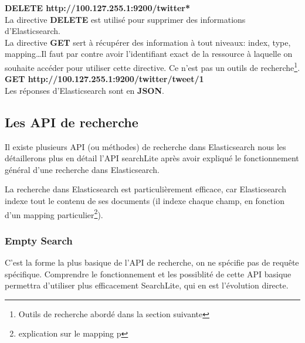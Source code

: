 {\textbf{DELETE  {\color{grey} http://100.127.255.1:9200}/{\color{red}twitter*}}\\

La directive \textbf{DELETE} est utilisé pour supprimer des informations d'Elasticsearch.\\


La directive \textbf{GET} sert à récupérer des information à tout niveaux: index,
type, mapping\ldots Il faut par contre avoir l'identifiant exact de la ressource à laquelle on souhaite accéder pour utiliser cette directive.
Ce n'est pas un outils de recherche\footnote{Outils de recherche abordé dans la section suivante}.\\[2mm]
\textbf{GET  {\color{grey} http://100.127.255.1:9200}/{\color{red}twitter}/{\color{cyan}tweet}/{\color{yellow}1}}\\

Les réponses d'Elasticsearch sont en \textbf{JSON}. 


\subsection{Les API de recherche}

Il existe plusieurs API (ou méthodes) de recherche dans Elasticsearch nous les  
détaillerons plus en détail l'API searchLite après avoir expliqué le fonctionnement général d'une recherche dans Elasticsearch.

La recherche dans Elasticsearch est particulièrement efficace, car Elasticsearch 
indexe tout le contenu de ses documents (il indexe chaque champ, en fonction d'un
mapping particulier\footnote{explication sur le mapping p\pageref{sec:mappingetanalys}}).

\subsubsection{Empty Search}
C'est la forme la plus basique de l'API de recherche, on ne spécifie pas de requête
spécifique. Comprendre le fonctionnement et les possiblité de cette API basique 
permettra d'utiliser plus efficacement SearchLite, qui en est l'évolution directe.


}
